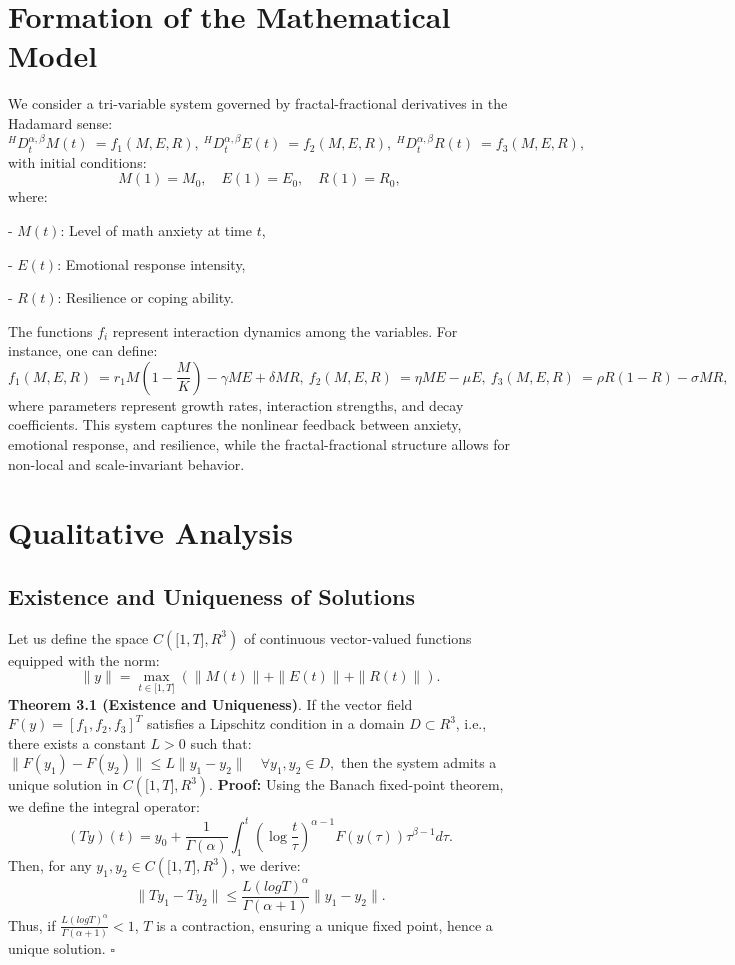 \documentclass[10pt]{NSP1}
\begin{document}
\section{Formation of the Mathematical Model}
We consider a tri-variable system governed by fractal-fractional derivatives in the Hadamard sense:
\[^{H}D_{t}^{\alpha,\beta}M(t)\  = f_{1}(M,E,R),\ ^{H}D_{t}^{\alpha,\beta}E(t)\  = f_{2}(M,E,R),\ ^{H}D_{t}^{\alpha,\beta}R(t)\  = f_{3}(M,E,R),\ \]
with initial conditions:
\[M(1) = M_{0},\quad E(1) = E_{0},\quad R(1) = R_{0},\]
where:

- \(M(t)\): Level of math anxiety at time \(t\),

- \(E(t)\): Emotional response intensity,

- \(R(t)\): Resilience or coping ability.

The functions \(f_{i}\) represent interaction dynamics among the variables. For instance, one can define:
\[f_{1}(M,E,R)\  = r_{1}M\left( 1 - \frac{M}{K} \right) - \gamma ME + \delta MR,\ f_{2}(M,E,R)\  = \eta ME - \mu E,\ f_{3}(M,E,R)\  = \rho R(1 - R) - \sigma MR,\ \]
where parameters represent growth rates, interaction strengths, and decay coefficients.
This system captures the nonlinear feedback between anxiety, emotional response, and resilience, while the fractal-fractional structure allows for non-local and scale-invariant behavior.
\section{Qualitative Analysis}
\subsection{Existence and Uniqueness of Solutions}
Let us define the space \(C\left( \lbrack 1,T\rbrack,R^{3} \right)\) of continuous vector-valued functions equipped with the norm:
\[\parallel y \parallel = \max_{t \in \lbrack 1,T\rbrack}\left( \parallel M(t) \parallel + \parallel E(t) \parallel + \parallel R(t) \parallel \right).\]
\textbf{Theorem 3.1 (Existence and Uniqueness)}. If the vector field \(F(y) = \left\lbrack f_{1},f_{2},f_{3} \right\rbrack^{T}\) satisfies a Lipschitz condition in a domain \(D \subset R^{3}\), i.e., there exists a constant \(L > 0\) such that: \(\parallel F\left( y_{1} \right) - F\left( y_{2} \right) \parallel \leq L \parallel y_{1} - y_{2} \parallel \quad\forall y_{1},y_{2} \in D,\) then the system admits a unique solution in \(C\left( \lbrack 1,T\rbrack,R^{3} \right)\).
\textbf{Proof:} Using the Banach fixed-point theorem, we define the integral operator:
\[(Ty)(t) = y_{0} + \frac{1}{\Gamma(\alpha)}\int_{1}^{t}{}\left( \log\frac{t}{\tau} \right)^{\alpha - 1}F\left( y(\tau) \right)\tau^{\beta - 1}d\tau.\]
Then, for any \(y_{1},y_{2} \in C\left( \lbrack 1,T\rbrack,R^{3} \right)\), we derive:
\[\parallel Ty_{1} - Ty_{2} \parallel \leq \frac{L(logT)^{\alpha}}{\Gamma(\alpha + 1)} \parallel y_{1} - y_{2} \parallel .\]
Thus, if \(\frac{L(logT)^{\alpha}}{\Gamma(\alpha + 1)} < 1\), \(T\) is a contraction, ensuring a unique fixed point, hence a unique solution. \(\square\)
\end{document}
